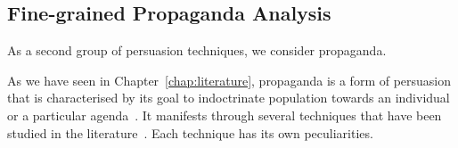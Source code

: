 








\subsection{\statusorange Fine-grained Propaganda Analysis}
\label{ssec:lp_techniques_propaganda}

As a second group of persuasion techniques, we consider \gls{propaganda}.

As we have seen in Chapter~\ref{chap:literature}, propaganda is a form of persuasion that is characterised by its goal to indoctrinate population towards an individual or a particular agenda~\citep{bernays}.
It manifests through several techniques that have been studied in the literature~\citep{torok2015symbiotic}. Each technique has its own peculiarities.

